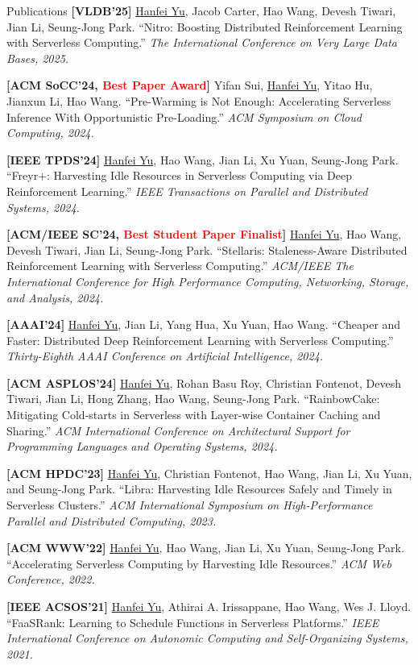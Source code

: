 \documentclass{resume} %
\begin{document}
\begin{rSection}{Publications}
\textbf{[VLDB'25]} \underline{Hanfei Yu}, Jacob Carter, Hao Wang, Devesh Tiwari, Jian Li, Seung-Jong Park. ``Nitro: Boosting Distributed Reinforcement Learning with Serverless Computing.'' \textit{The International Conference on Very Large Data Bases, 2025.}

\textbf{[ACM SoCC'24, \textcolor{red}{Best Paper Award}]} Yifan Sui, \underline{Hanfei Yu}, Yitao Hu, Jianxun Li, Hao Wang. ``Pre-Warming is Not Enough: Accelerating Serverless Inference With Opportunistic Pre-Loading.'' \textit{ACM Symposium on Cloud Computing, 2024.}

\textbf{[IEEE TPDS'24]} \underline{Hanfei Yu}, Hao Wang, Jian Li, Xu Yuan, Seung-Jong Park. ``Freyr+: Harvesting Idle Resources in Serverless Computing via Deep Reinforcement Learning.'' \textit{IEEE Transactions on Parallel and Distributed Systems, 2024.}

\textbf{[ACM/IEEE SC'24, \textcolor{red}{Best Student Paper Finalist}]} \underline{Hanfei Yu}, Hao Wang, Devesh Tiwari, Jian Li, Seung-Jong Park. ``Stellaris: Staleness-Aware Distributed Reinforcement Learning with Serverless Computing.'' \textit{ACM/IEEE The International Conference for High Performance Computing, Networking, Storage, and Analysis, 2024.}

\textbf{[AAAI'24]} \underline{Hanfei Yu}, Jian Li, Yang Hua, Xu Yuan, Hao Wang. ``Cheaper and Faster: Distributed Deep Reinforcement Learning with Serverless Computing.'' \textit{Thirty-Eighth AAAI Conference on Artificial Intelligence, 2024.}

\textbf{[ACM ASPLOS'24]} \underline{Hanfei Yu}, Rohan Basu Roy, Christian Fontenot, Devesh Tiwari, Jian Li, Hong Zhang, Hao Wang, Seung-Jong Park. ``RainbowCake: Mitigating Cold-starts in Serverless with Layer-wise Container Caching and Sharing.'' \textit{ACM International Conference on Architectural Support for Programming Languages and Operating Systems, 2024.}

\textbf{[ACM HPDC'23]} \underline{Hanfei Yu}, Christian Fontenot, Hao Wang, Jian Li, Xu Yuan, and Seung-Jong Park. ``Libra: Harvesting Idle Resources Safely and Timely in Serverless Clusters.'' \textit{ACM International Symposium on High-Performance Parallel and Distributed Computing, 2023.}

\textbf{[ACM WWW'22]} \underline{Hanfei Yu}, Hao Wang, Jian Li, Xu Yuan, Seung-Jong Park. ``Accelerating Serverless Computing by Harvesting Idle Resources.'' \textit{ACM Web Conference, 2022.}

\textbf{[IEEE ACSOS'21]} \underline{Hanfei Yu}, Athirai A. Irissappane, Hao Wang, Wes J. Lloyd. ``FaaSRank: Learning to Schedule Functions in Serverless Platforms.'' \textit{IEEE International Conference on Autonomic Computing and Self-Organizing Systems, 2021.}


\end{rSection}
\end{document}
